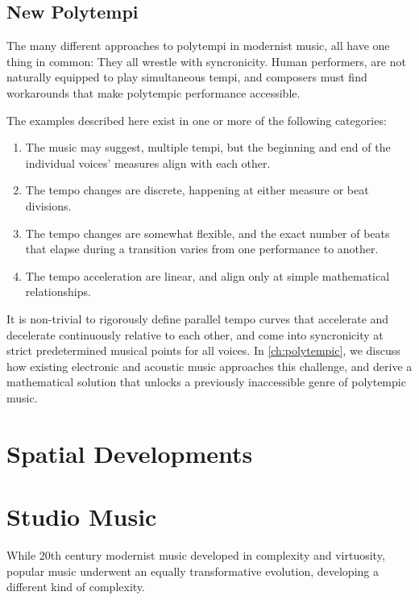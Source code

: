 
\subsection{New Polytempi}
\label{sec:new-polytempi}
The many different approaches to polytempi in modernist music, all
have one thing in common: They all wrestle with syncronicity. Human
performers, are not naturally equipped to play simultaneous tempi, and
composers must find workarounds that make polytempic performance
accessible.

The examples described here exist in one or more of the following
categories:
\begin{enumerate}
\item The music may suggest, multiple tempi, but the beginning and end
  of the individual voices' measures align with each other.
\item The tempo changes are discrete, happening at either measure
  or beat divisions.
\item The tempo changes are somewhat flexible, and  the exact number of
  beats that elapse during a transition varies from one performance to
  another.
\item The tempo acceleration are linear, and align only at simple
  mathematical relationships.
\end{enumerate}
It is non-trivial to rigorously define parallel tempo curves that
accelerate and decelerate continuously relative to each other, and
come into syncronicity at strict predetermined musical points for all
voices. In \autoref{ch:polytempic}, we discuss how existing electronic
and acoustic music approaches this challenge, and derive a
mathematical solution that unlocks a previously inaccessible genre of
polytempic music.

\section{Spatial Developments}
\label{sec:spatial-developments}


\section{Studio Music}
\label{sec:studio-music}
While 20th century modernist music developed in complexity and
virtuosity, popular music underwent an equally transformative
evolution, developing a different kind of complexity. 

